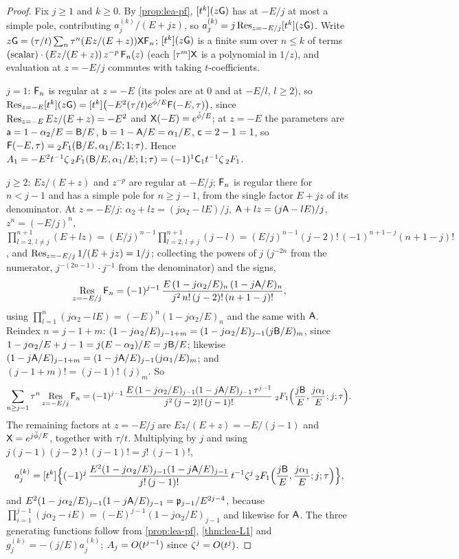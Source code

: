 \begin{proof}
Fix $j\geq 1$ and $k\geq 0$. By \cref{prop:lea-pf}, $[t^k](z\mathsf{G})$ has at $-E/j$ at most a simple pole, contributing $a_j^{(k)}/(E+jz)$, so $a_j^{(k)} = j\operatorname*{Res}_{z=-E/j}[t^k](z\mathsf{G})$. Write $z\mathsf{G} = (\tau/t)\sum_n\tau^n(Ez/(E+z))\mathsf{X}\mathsf{F}_n$; $[t^k](z\mathsf{G})$ is a finite sum over $n\leq k$ of terms $(\text{scalar})\cdot(Ez/(E+z))\,z^{-p}\,\mathsf{F}_n(z)$ (each $[\tau^m]\mathsf{X}$ is a polynomial in $1/z$), and evaluation at $z = -E/j$ commutes with taking $t$-coefficients.

$j = 1$: $\mathsf{F}_n$ is regular at $z = -E$ (its poles are at $0$ and at $-E/l$, $l\geq 2$), so $\operatorname*{Res}_{z=-E}[t^k](z\mathsf{G}) = [t^k]\bigl(-E^2(\tau/t)e^{\breve{\phi}/E}\mathsf{F}(-E,\tau)\bigr)$, since $\operatorname*{Res}_{z=-E}Ez/(E+z) = -E^2$ and $\mathsf{X}(-E) = e^{\breve{\phi}/E}$; at $z = -E$ the parameters are $\mathsf{a} = 1-\alpha_2/E = \mathsf{B}/E$, $\mathsf{b} = 1-\mathsf{A}/E = \alpha_1/E$, $\mathsf{c} = 2-1 = 1$, so $\mathsf{F}(-E,\tau) = {}_2F_1(\mathsf{B}/E,\alpha_1/E;1;\tau)$. Hence $A_1 = -E^2t^{-1}\zeta\,{}_2F_1(\mathsf{B}/E,\alpha_1/E;1;\tau) = (-1)^1\mathsf{C}_1t^{-1}\zeta\,{}_2F_1$.

$j\geq 2$: $Ez/(E+z)$ and $z^{-p}$ are regular at $-E/j$; $\mathsf{F}_n$ is regular there for $n < j-1$ and has a simple pole for $n\geq j-1$, from the single factor $E+jz$ of its denominator. At $z = -E/j$: $\alpha_2+lz = (j\alpha_2-lE)/j$, $\mathsf{A}+lz = (j\mathsf{A}-lE)/j$, $z^n = (-E/j)^n$, $\prod_{l=2,\,l\neq j}^{n+1}(E+lz) = (E/j)^{n-1}\prod_{l=2,\,l\neq j}^{n+1}(j-l) = (E/j)^{n-1}(j-2)!\,(-1)^{n+1-j}(n+1-j)!$, and $\operatorname*{Res}_{z=-E/j}1/(E+jz) = 1/j$; collecting the powers of $j$ ($j^{-2n}$ from the numerator, $j^{-(2n-1)}\cdot j^{-1}$ from the denominator) and the signs,
\[
\operatorname*{Res}_{z=-E/j}\mathsf{F}_n = (-1)^{j-1}\,\frac{E\,(1-j\alpha_2/E)_n\,(1-j\mathsf{A}/E)_n}{j^2\,n!\,(j-2)!\,(n+1-j)!},
\]
using $\prod_{l=1}^{n}(j\alpha_2-lE) = (-E)^n(1-j\alpha_2/E)_n$ and the same with $\mathsf{A}$. Reindex $n = j-1+m$: $(1-j\alpha_2/E)_{j-1+m} = (1-j\alpha_2/E)_{j-1}(j\mathsf{B}/E)_m$, since $1-j\alpha_2/E+j-1 = j(E-\alpha_2)/E = j\mathsf{B}/E$; likewise $(1-j\mathsf{A}/E)_{j-1+m} = (1-j\mathsf{A}/E)_{j-1}(j\alpha_1/E)_m$; and $(j-1+m)! = (j-1)!\,(j)_m$. So
\[
\sum_{n\geq j-1}\tau^n\operatorname*{Res}_{z=-E/j}\mathsf{F}_n = (-1)^{j-1}\,\frac{E\,(1-j\alpha_2/E)_{j-1}(1-j\mathsf{A}/E)_{j-1}\,\tau^{j-1}}{j^2\,(j-2)!\,(j-1)!}\;{}_2F_1\Bigl(\frac{j\mathsf{B}}{E},\frac{j\alpha_1}{E};j;\tau\Bigr).
\]
The remaining factors at $z = -E/j$ are $Ez/(E+z) = -E/(j-1)$ and $\mathsf{X} = e^{j\breve{\phi}/E}$, together with $\tau/t$. Multiplying by $j$ and using $j(j-1)(j-2)!\,(j-1)! = j!\,(j-1)!$,
\[
a_j^{(k)} = [t^k]\Bigl\{(-1)^j\,\frac{E^2(1-j\alpha_2/E)_{j-1}(1-j\mathsf{A}/E)_{j-1}}{j!\,(j-1)!}\,t^{-1}\zeta^j\,{}_2F_1\Bigl(\frac{j\mathsf{B}}{E},\frac{j\alpha_1}{E};j;\tau\Bigr)\Bigr\},
\]
and $E^2(1-j\alpha_2/E)_{j-1}(1-j\mathsf{A}/E)_{j-1} = \mathfrak{p}_{j-1}/E^{2j-4}$, because $\prod_{i=1}^{j-1}(j\alpha_2-iE) = (-E)^{j-1}(1-j\alpha_2/E)_{j-1}$ and likewise for $\mathsf{A}$. The three generating functions follow from \cref{prop:lea-pf}, \cref{thm:lea-L1} and $g_j^{(k)} = -(j/E)a_j^{(k)}$; $A_j = O(t^{j-1})$ since $\zeta^j = O(t^j)$.
\end{proof}

